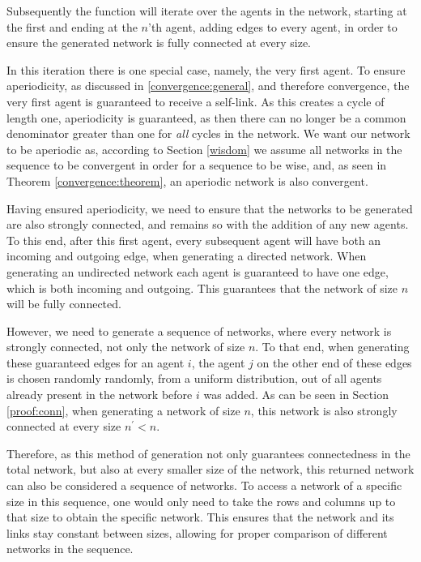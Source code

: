 \documentclass[a4paper, 12pt]{report}
\begin{document}
\noindent Subsequently the function will iterate over the agents in the network, starting at the first and ending at the $n$'th agent, adding edges to every agent, in order to ensure the generated network is fully connected at every size. 

\noindent In this iteration there is one special case, namely, the very first agent. To ensure aperiodicity, as discussed in \ref{convergence:general}, and therefore convergence, the very first agent is guaranteed to receive a self-link. As this creates a cycle of length one, aperiodicity is guaranteed, as then there can no longer be a common denominator greater than one for \emph{all} cycles in the network. We want our network to be aperiodic as, according to Section \ref{wisdom} we assume all networks in the sequence to be convergent in order for a sequence to be wise, and, as seen in Theorem \ref{convergence:theorem}, an aperiodic network is also convergent.

\noindent Having ensured aperiodicity, we need to ensure that the networks to be generated are also strongly connected, and remains so with the addition of any new agents. To this end, after this first agent, every subsequent agent will have both an incoming and outgoing edge, when generating a directed network. When generating an undirected network each agent is guaranteed to have one edge, which is both incoming and outgoing. This guarantees that the network of size $n$ will be fully connected. 

\noindent However, we need to generate a sequence of networks, where every network is strongly connected, not only the network of size $n$. To that end, when generating these guaranteed edges for an agent $i$, the agent $j$ on the other end of these edges is chosen randomly randomly, from a uniform distribution, out of all agents already present in the network before $i$ was added. As can be seen in Section \ref{proof:conn}, when generating a network of size $n$, this network is also strongly connected at every size $n^{\prime} < n$.

\noindent Therefore, as this method of generation not only guarantees connectedness in the total network, but also at every smaller size of the network, this returned network can also be considered a sequence of networks. To access a network of a specific size in this sequence, one would only need to take the rows and columns up to that size to obtain the specific network. This ensures that the network and its links stay constant between sizes, allowing for proper comparison of different networks in the sequence. 
\end{document}
